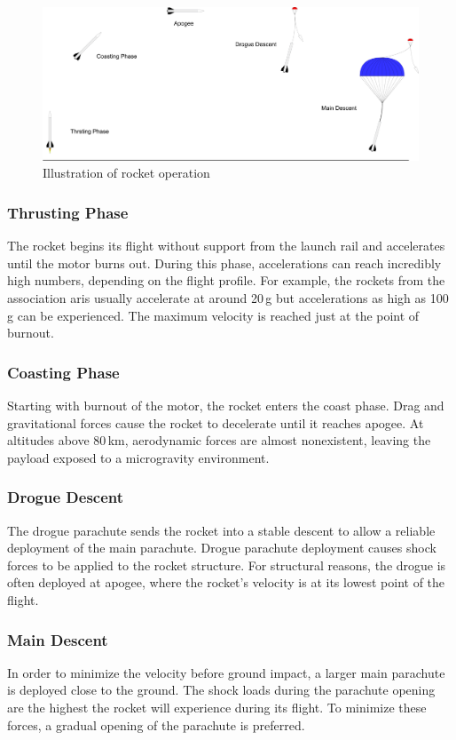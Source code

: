 \begin{figure}[h!]
	\centering
	\includegraphics[width=\textwidth]{images/rocket-operation}
	\caption{Illustration of rocket operation}
	\label{fig:operation}
\end{figure}

\subsubsection{Thrusting Phase}
The rocket begins its flight without support from the launch rail and accelerates until the motor burns out. During this phase, accelerations can reach incredibly high numbers, depending on the flight profile. For example, the rockets from the association \acrshort{aris} usually accelerate at around 20\,g but accelerations as high as 100\,g can be experienced. The maximum velocity is reached just at the point of burnout.

\subsubsection{Coasting Phase}
Starting with burnout of the motor, the rocket enters the coast phase. Drag and gravitational forces cause the rocket to decelerate until it reaches apogee. At altitudes above 80\,km, aerodynamic forces are almost nonexistent, leaving the payload exposed to a microgravity environment.

\subsubsection{Drogue Descent}
The drogue parachute sends the rocket into a stable descent to allow a reliable deployment of the main parachute. Drogue parachute deployment causes shock forces to be applied to the rocket structure. For structural reasons, the drogue is often deployed at apogee, where the rocket's velocity is at its lowest point of the flight.

\subsubsection{Main Descent}
In order to minimize the velocity before ground impact, a larger main parachute is deployed close to the ground. The shock loads during the parachute opening are the highest the rocket will experience during its flight. To minimize these forces, a gradual opening of the parachute is preferred.

